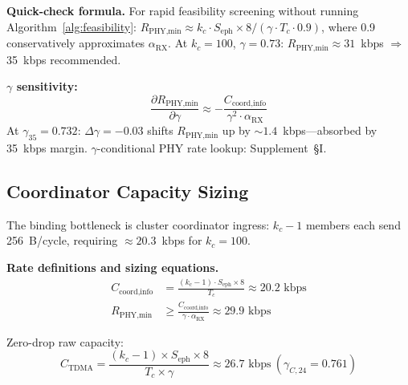 \documentclass[journal]{IEEEtran}
\begin{document}
\textbf{Quick-check formula.} For rapid feasibility screening without running Algorithm~\ref{alg:feasibility}: $R_{\text{PHY,min}} \approx k_c \cdot S_{\text{eph}} \times 8 / (\gamma \cdot T_c \cdot 0.9)$, where 0.9 conservatively approximates $\alpha_{\text{RX}}$. At $k_c = 100$, $\gamma = 0.73$: $R_{\text{PHY,min}} \approx 31$~kbps $\Rightarrow$ 35~kbps recommended.

\textbf{$\gamma$ sensitivity:}
\begin{equation}
    \frac{\partial R_{\text{PHY,min}}}{\partial \gamma} \approx -\frac{C_{\text{coord,info}}}{\gamma^2 \cdot \alpha_{\text{RX}}}
    \label{eq:dR_dgamma}
\end{equation}
At $\gamma_{35} = 0.732$: $\Delta\gamma = -0.03$ shifts $R_{\text{PHY,min}}$ up by ${\sim}1.4$~kbps---absorbed by 35~kbps margin. $\gamma$-conditional PHY rate lookup: Supplement~\S I.

\subsection{Coordinator Capacity Sizing}
\label{sec:coordinator_bandwidth}

The binding bottleneck is cluster coordinator ingress: $k_c - 1$ members each send 256~B/cycle, requiring ${\approx}20.3$~kbps for $k_c = 100$.

\textbf{Rate definitions and sizing equations.}
\begin{align}
    C_{\text{coord,info}} &= \frac{(k_c - 1) \cdot S_{\text{eph}} \times 8}{T_c} \approx 20.2 \text{~kbps} \label{eq:coord_info} \\
    R_{\text{PHY,min}} &\geq \frac{C_{\text{coord,info}}}{\gamma \cdot \alpha_{\text{RX}}} \approx 29.9 \text{~kbps} \label{eq:coord_phy}
\end{align}

Zero-drop raw capacity:
\begin{equation}
    C_{\text{TDMA}} = \frac{(k_c - 1) \times S_{\text{eph}} \times 8}{T_c \times \gamma} \approx 26.7 \text{~kbps}~(\gamma_{C,24} = 0.761)
    \label{eq:tdma_capacity}
\end{equation}
\end{document}
